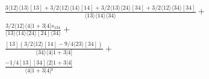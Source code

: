 \documentclass[varwidth, border=5pt]{standalone}
\begin{document}
\begin{my}
$\begin{gathered}
\scriptscriptstyle\frac{3⟨12⟩⟨13⟩[13]+3/2⟨12⟩⟨14⟩[14]+3/2⟨13⟩⟨24⟩[34]+3/2⟨12⟩⟨34⟩[34]}{⟨13⟩⟨14⟩⟨34⟩} +\\
\scriptscriptstyle\frac{3/2⟨12⟩⟨4|1+3|4]s_{134}}{⟨13⟩⟨14⟩⟨24⟩[24]⟨34⟩} +\\
\scriptscriptstyle\frac{[13](3/2⟨12⟩[14]-9/4⟨23⟩[34])}{⟨34⟩⟨4|1+3|4]} +\\
\scriptscriptstyle\frac{-1/4[13][34]⟨2|1+3|4]}{⟨4|1+3|4]²} \phantom{+}
\end{gathered}$
\end{my}
\end{document}
